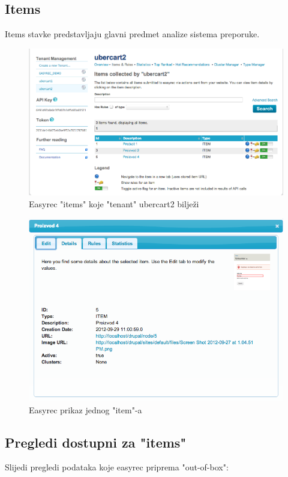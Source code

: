 \documentclass[times, utf8, seminar]{fit}
\begin{document}
{{\subsection{Items}

Items stavke predstavljaju glavni predmet analize sistema preporuke.

\begin{figure}[H]
\centering
\includegraphics[width=12cm]{img/easyrec_2_item.png}
\caption{Easyrec "items" koje "tenant" ubercart2 bilježi}
\end{figure}

\begin{figure}[H]
\centering
\includegraphics[width=12cm]{img/easyrec_3_item.png}
\caption{Easyrec prikaz jednog "item"-a}
\end{figure}

\subsection{Pregledi dostupni za "items"}

Slijedi pregledi podataka koje easyrec priprema "out-of-box":

}}
\end{document}
